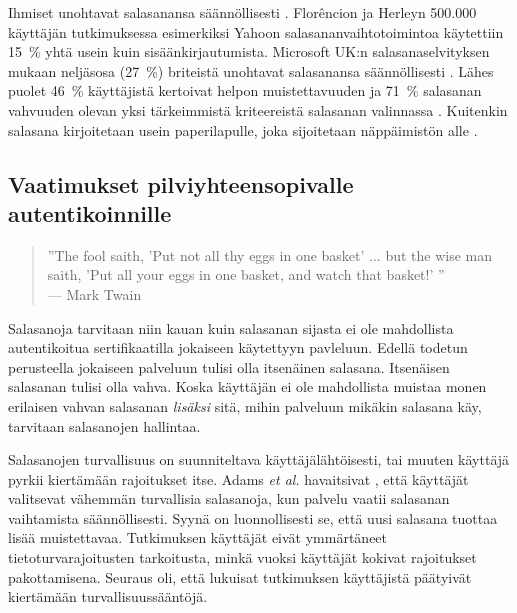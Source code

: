 \documentclass{tktltiki}
\begin{document}
Ihmiset unohtavat salasanansa säännöllisesti \cite{ponemon_pw_survey_06}. Florêncion ja Herleyn 500.000 käyttäjän tutkimuksessa \cite{study_of_passwords_07} esimerkiksi Yahoon salasananvaihtotoimintoa käytettiin 15~\% yhtä usein kuin sisäänkirjautumista. Microsoft UK:n salasanaselvityksen mukaan neljäsosa (27~\%) briteistä unohtavat salasanansa säännöllisesti \cite{microsoft_pw_survey_04}. Lähes puolet 46~\% käyttäjistä kertoivat helpon muistettavuuden ja 71~\% salasanan vahvuuden olevan yksi tärkeimmistä kriteereistä salasanan valinnassa \cite{symantec_pw_survey_10}. Kuitenkin salasana kirjoitetaan usein paperilapulle, joka sijoitetaan näppäimistön alle \cite{pw_auth_system_perspective_08}.


\subsection{Vaatimukset pilviyhteensopivalle autentikoinnille}

  \begin{quote}
      ''The fool saith, 'Put not all thy eggs in one basket' ... 
      but the wise man saith, 'Put all your eggs in one basket, and watch that basket!' ''
      \\--- Mark Twain \cite{twain_eggs_1894}
  \end {quote}

Salasanoja tarvitaan niin kauan kuin salasanan sijasta ei ole mahdollista autentikoitua sertifikaatilla jokaiseen käytettyyn pavleluun. Edellä todetun perusteella jokaiseen palveluun tulisi olla itsenäinen salasana. Itsenäisen salasanan tulisi olla vahva. Koska käyttäjän ei ole mahdollista muistaa monen erilaisen vahvan salasanan \emph{lisäksi} sitä, mihin palveluun mikäkin salasana käy, tarvitaan salasanojen hallintaa. 

Salasanojen turvallisuus on suunniteltava käyttäjälähtöisesti, tai muuten käyttäjä pyrkii kiertämään rajoitukset itse. Adams \emph{et al.} havaitsivat \cite{users_are_not_the_enemy_99}, että käyttäjät valitsevat vähemmän turvallisia salasanoja, kun palvelu vaatii salasanan vaihtamista säännöllisesti. Syynä on luonnollisesti se, että uusi salasana tuottaa lisää muistettavaa. Tutkimuksen käyttäjät eivät ymmärtäneet tietoturvarajoitusten tarkoitusta, minkä vuoksi käyttäjät kokivat rajoitukset pakottamisena. Seuraus oli, että lukuisat tutkimuksen käyttäjistä päätyivät kiertämään turvallisuussääntöjä.
\end{document}
